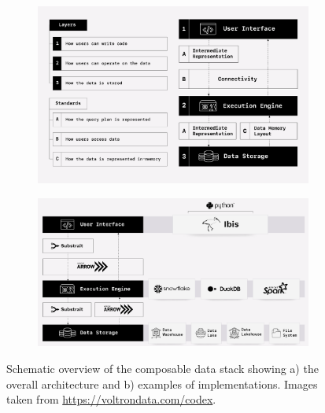 \documentclass[
  authoryear]{elsarticle}
\begin{document}
\begin{figure}

\begin{minipage}{\linewidth}

\begin{figure}[H]

{\centering \includegraphics{images/composable-data-stack.png}

}


\end{figure}%

\end{minipage}%
\newline
\begin{minipage}{\linewidth}

\begin{figure}[H]

{\centering \includegraphics{images/composable-data-stack-implementation-2.png}

}


\end{figure}%

\end{minipage}%

\caption{\label{fig-composable-data-stack}Schematic overview of the
composable data stack showing a) the overall architecture and b)
examples of implementations. Images taken from
\url{https://voltrondata.com/codex}.}

\end{figure}%
\end{document}
